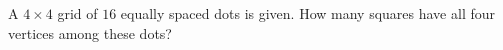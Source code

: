 A $4\times4$ grid of $16$ equally spaced dots is given. How many squares have all four vertices among these dots?
